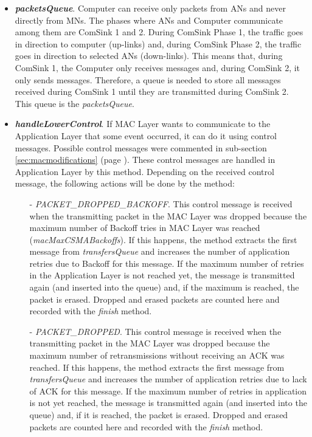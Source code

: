 \begin{itemize}
  \item \textbf{\textit{packetsQueue}}. Computer can receive only packets from \acp{AN} and never directly from \acp{MN}. The phases where \acp{AN}
  and Computer communicate among them are ComSink 1 and 2. During ComSink Phase 1, the traffic goes in direction to computer (up-links) and, during
  ComSink Phase 2, the traffic goes in direction to selected \acp{AN} (down-links). This means that, during ComSink 1, the Computer only receives messages
  and, during ComSink 2, it only sends messages. Therefore, a queue is needed to store all messages received during ComSink 1 until they are
  transmitted during ComSink 2. This queue is the \textit{packetsQueue}.

  \item \textbf{\textit{handleLowerControl}}. If \ac{MAC} Layer wants to communicate to the Application Layer that some event occurred, it can do 
  it using control messages. Possible control messages were commented in sub-section \ref{sec:macmodifications} (page \pageref{sec:macmodifications}).
  These control messages are handled in Application Layer by this method. Depending on the received control message, the following actions will
  be done by the method:
  \begin{itemize}
    \item[-] \textit{PACKET\_DROPPED\_BACKOFF}. This control message is received when the transmitting packet in the \ac{MAC} Layer was dropped 
    because the maximum number of Backoff tries in \ac{MAC} Layer was reached (\textit{macMaxCSMABackoffs}). If this happens, the method extracts 
    the first message from \textit{transfersQueue} and increases the number of application retries due to Backoff for this message. If the maximum 
    number of retries in the Application Layer is not reached yet, the message is transmitted again (and inserted into the queue) and, if the maximum is 
    reached, the packet is erased. Dropped and erased packets are counted here and recorded with the \textit{finish} method.

    \item[-] \textit{PACKET\_DROPPED}. This control message is received when the transmitting packet in the \ac{MAC} Layer was dropped because
    the maximum number of retransmissions without receiving an \ac{ACK} was reached. If this happens, the method extracts the first message from
    \textit{transfersQueue} and increases the number of application retries due to lack of \ac{ACK} for this message. If the maximum number of 
    retries in application is not yet reached, the message is transmitted again (and inserted into the queue) and, if it is reached, the packet 
    is erased. Dropped and erased packets are counted here and recorded with the \textit{finish} method.


\end{itemize}
\end{itemize}
